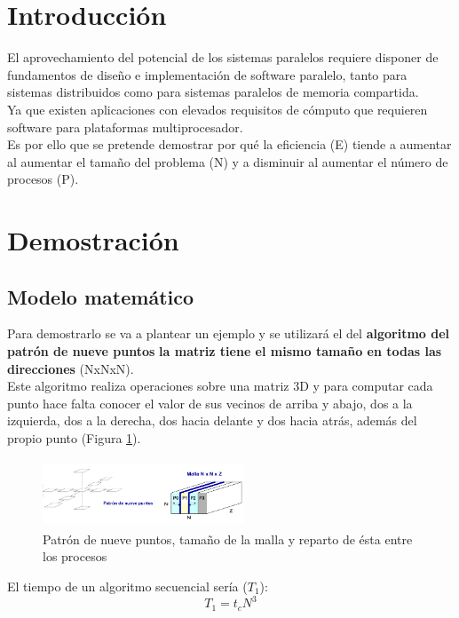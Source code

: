 \documentclass[10pt,twocolumn,a4paper]{article}
\begin{document}
\section{Introducción}

El aprovechamiento del potencial de los sistemas paralelos requiere disponer de fundamentos de diseño e implementación de software paralelo, tanto para sistemas distribuidos como para sistemas paralelos de memoria compartida.\\
Ya que existen aplicaciones con elevados requisitos de cómputo que requieren software para plataformas multiprocesador.\\ Es por ello que se pretende demostrar por qué la eficiencia (E) tiende a aumentar al aumentar el tamaño del problema (N) y a disminuir al aumentar el número de procesos (P).
\section{Demostración}
\subsection{Modelo matemático}
Para demostrarlo se va a plantear un ejemplo y se utilizará el del \textbf{algoritmo del patrón de nueve puntos} \cite{Almeida2008} \textbf{la matriz tiene el mismo tamaño en todas las direcciones} (NxNxN). \\ Este algoritmo realiza operaciones sobre una matriz 3D y para computar cada punto hace falta conocer el valor de sus vecinos de arriba y abajo, dos a la izquierda, dos a la derecha, dos hacia delante y dos hacia atrás, además del propio punto (Figura \ref{fig:nuevePuntos}).
\begin{figure}[H]
\begin{center}
	\includegraphics[height=2cm, width=6cm]{nuevePuntos}
	\caption{Patrón de nueve puntos, tamaño de la malla y reparto de ésta entre los procesos}
	\label{fig:nuevePuntos}
	\end{center}
\end{figure}
El tiempo de un algoritmo secuencial sería ($T_{1}$):
\begin{equation}
	T_{1} = t_{c}N^{3}
\end{equation}
\end{document}
